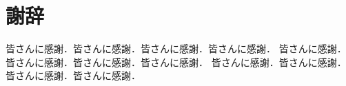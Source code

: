 ﻿%
\chapter*{謝辞}

皆さんに感謝．皆さんに感謝．皆さんに感謝．皆さんに感謝．
皆さんに感謝．皆さんに感謝．皆さんに感謝．皆さんに感謝．
皆さんに感謝．皆さんに感謝．皆さんに感謝．皆さんに感謝．
